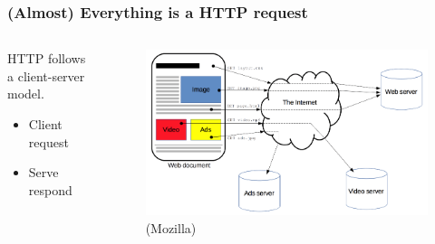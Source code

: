 \documentclass[compress, aspectratio=32]{beamer}
\begin{document}
\begin{frame}
    \frametitle{(Almost) Everything is a HTTP request}
    \begin{columns}
        \begin{column}[]{0.3\textwidth}
            HTTP follows a client-server model.
            \begin{itemize}
                \item Client request
                \item Serve respond
            \end{itemize}
        \end{column}
        \begin{column}[]{0.7\textwidth}
            \begin{figure}
                \includegraphics[width=\textwidth]{fetching_a_page.png}
                \caption*{(Mozilla)}
            \end{figure}            
        \end{column}
    \end{columns}
\end{frame}
\end{document}
